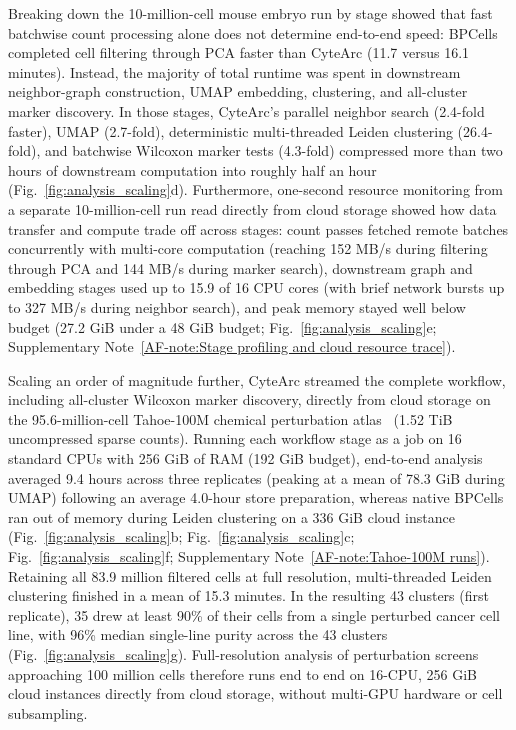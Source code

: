 \documentclass[11pt]{article}
\newcommand{\sref}[1]{\ref*{AF-#1}}
\begin{document}
Breaking down the 10-million-cell mouse embryo run by stage showed that fast batchwise count processing alone does not determine end-to-end speed: BPCells completed cell filtering through PCA faster than CyteArc (11.7 versus 16.1 minutes). Instead, the majority of total runtime was spent in downstream neighbor-graph construction, UMAP embedding, clustering, and all-cluster marker discovery. In those stages, CyteArc's parallel neighbor search (2.4-fold faster), UMAP (2.7-fold), deterministic multi-threaded Leiden clustering (26.4-fold), and batchwise Wilcoxon marker tests (4.3-fold) compressed more than two hours of downstream computation into roughly half an hour (Fig.~\ref{fig:analysis_scaling}d). Furthermore, one-second resource monitoring from a separate 10-million-cell run read directly from cloud storage showed how data transfer and compute trade off across stages: count passes fetched remote batches concurrently with multi-core computation (reaching 152 MB/s during filtering through PCA and 144 MB/s during marker search), downstream graph and embedding stages used up to 15.9 of 16 CPU cores (with brief network bursts up to 327 MB/s during neighbor search), and peak memory stayed well below budget (27.2 GiB under a 48 GiB budget; Fig.~\ref{fig:analysis_scaling}e; Supplementary Note~\sref{note:Stage profiling and cloud resource trace}).

Scaling an order of magnitude further, CyteArc streamed the complete workflow, including all-cluster Wilcoxon marker discovery, directly from cloud storage on the 95.6-million-cell Tahoe-100M chemical perturbation atlas~\cite{zhang2026tahoe100m} (1.52 TiB uncompressed sparse counts). Running each workflow stage as a job on 16 standard CPUs with 256 GiB of RAM (192 GiB budget), end-to-end analysis averaged 9.4 hours across three replicates (peaking at a mean of 78.3 GiB during UMAP) following an average 4.0-hour store preparation, whereas native BPCells ran out of memory during Leiden clustering on a 336 GiB cloud instance (Fig.~\ref{fig:analysis_scaling}b; Fig.~\ref{fig:analysis_scaling}c; Fig.~\ref{fig:analysis_scaling}f; Supplementary Note~\sref{note:Tahoe-100M runs}). Retaining all 83.9 million filtered cells at full resolution, multi-threaded Leiden clustering finished in a mean of 15.3 minutes. In the resulting 43 clusters (first replicate), 35 drew at least 90\% of their cells from a single perturbed cancer cell line, with 96\% median single-line purity across the 43 clusters (Fig.~\ref{fig:analysis_scaling}g). Full-resolution analysis of perturbation screens approaching 100 million cells therefore runs end to end on 16-CPU, 256 GiB cloud instances directly from cloud storage, without multi-GPU hardware or cell subsampling.
\end{document}
